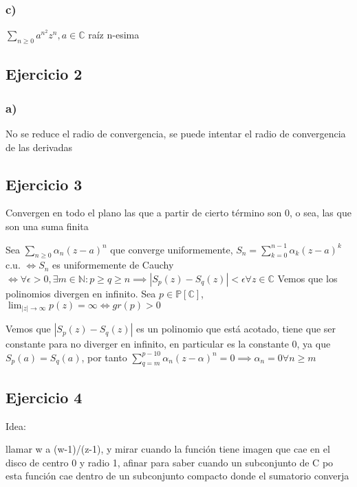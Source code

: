 \subsubsection{c)}
$\sum_{n\geq 0} a^{n^2}z^n,a\in\mathbb{C}$
raíz n-esima 


\subsection{Ejercicio 2}
\subsubsection{a)}
No se reduce el radio de convergencia, se puede intentar el radio de convergencia de las derivadas


\subsection{Ejercicio 3}
Convergen en todo el plano las que a partir de cierto término son 0, o sea, las que son una suma finita

Sea $\sum_{n\geq 0} \alpha_n (z-a)^n$ que converge uniformemente,
$S_n=\sum_{k=0}^{n-1} \alpha_k (z-a)^k$ c.u. $\Longleftrightarrow S_n$ es uniformemente de Cauchy $\Longleftrightarrow \forall\epsilon>0,\exists m\in\mathbb{N}: p\geq q\geq n \implies |S_p(z)-S_q(z)| < \epsilon \forall z\in\mathbb{C}$
Vemos que los polinomios divergen en infinito.
Sea $p\in\mathbb{P}[\mathbb{C}]$, $\lim_{|z|\rightarrow\infty} p(z) = \infty \Longleftrightarrow gr(p)>0 $

Vemos que $|S_p(z)-S_q(z)|$ es un polinomio que está acotado, tiene que ser constante para no diverger en infinito, en particular es la constante $0$, ya que $S_p(a)=S_q(a)$, por tanto $\sum_{q=m}^{p-10} \alpha_n (z-\alpha)^n = 0 \implies  \alpha_n=0 \forall n\geq m$

\subsection{Ejercicio 4}
Idea:

llamar w a (w-1)/(z-1), y mirar cuando la función tiene imagen que cae en el disco de centro 0 y radio 1, afinar para saber cuando un subconjunto de C po esta función cae dentro de un subconjunto compacto donde el sumatorio converja
